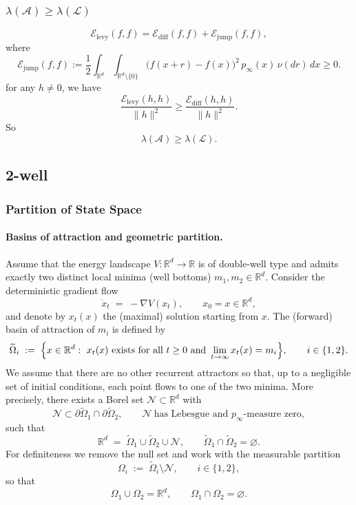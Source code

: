 \subsubsection{\(\lambda(\mathcal A)\ge \lambda(\mathcal L)\)}

\[
\mathcal E_{\mathrm{levy}}(f,f)
=
\mathcal E_{\mathrm{diff}}(f,f)+\mathcal E_{\mathrm{jump}}(f,f),
\]
where
\[
\mathcal E_{\mathrm{jump}}(f,f)
:=
\frac12\int_{\mathbb R^d}\int_{\mathbb R^d\setminus\{0\}}
\big(f(x+r)-f(x)\big)^2\,p_\infty(x)\,\nu(dr)\,dx
\ge 0.
\]
for any \(h\neq 0\), we have
\[
\frac{\mathcal E_{\mathrm{levy}}(h,h)}{\|h\|^2}
\ge
\frac{\mathcal E_{\mathrm{diff}}(h,h)}{\|h\|^2}.
\]
So
\[
\lambda(\mathcal A)\ge \lambda(\mathcal L).
\]
\subsection{2-well}
\subsubsection{Partition of State Space}\label{sec:partition}

\paragraph{Basins of attraction and geometric partition.}
Assume that the energy landscape $V:\mathbb R^d\to\mathbb R$ is of double-well type and admits exactly two distinct local minima (well bottoms) $m_1,m_2\in\mathbb R^d$.
Consider the deterministic gradient flow
\[
\dot x_t \;=\; -\nabla V(x_t),
\qquad x_0 = x\in\mathbb R^d,
\]
and denote by $x_t(x)$ the (maximal) solution starting from $x$.
The (forward) basin of attraction of $m_i$ is defined by
\[
\widetilde\Omega_i
\;:=\;
\Bigl\{x\in\mathbb R^d:\ x_t(x)\ \text{exists for all }t\ge 0
\ \text{and}\ \lim_{t\to\infty}x_t(x)=m_i\Bigr\},
\qquad i\in\{1,2\}.
\]
We assume that there are no other recurrent attractors so that, up to a negligible set of initial conditions,
each point flows to one of the two minima.
More precisely, there exists a Borel set $\mathcal N\subset\mathbb R^d$ with
\[
\mathcal N\subset\partial\widetilde\Omega_1\cap\partial\widetilde\Omega_2,
\qquad
\mathcal N\ \text{has Lebesgue and $p_\infty$-measure zero},
\]
such that
\[
\mathbb R^d
\;=\;
\widetilde\Omega_1\cup\widetilde\Omega_2\cup\mathcal N,
\qquad
\widetilde\Omega_1\cap\widetilde\Omega_2=\varnothing.
\]
For definiteness we remove the null set and work with the measurable partition
\[
\Omega_i \;:=\; \widetilde\Omega_i\setminus\mathcal N,
\qquad i\in\{1,2\},
\]
so that
\[
\Omega_1\cup\Omega_2=\mathbb R^d,
\qquad
\Omega_1\cap\Omega_2=\varnothing.
\]



